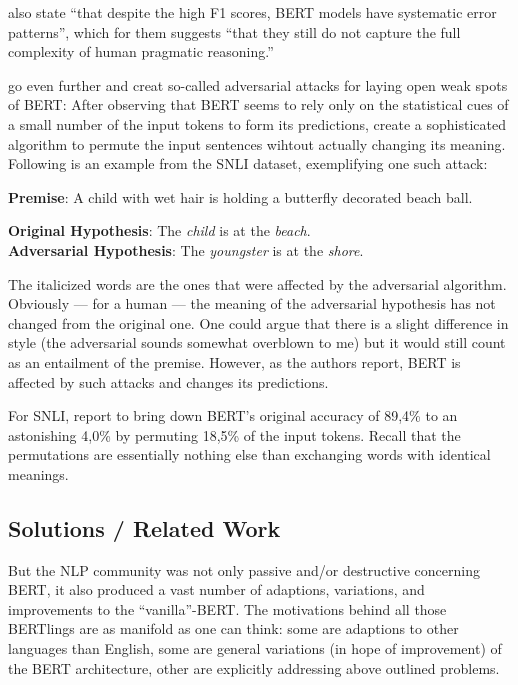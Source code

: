 \cite{jiang2019evaluating} also state ``that despite the high F1 scores, BERT models have
systematic error patterns'', which for them suggests ``that they still do not capture the
full complexity of human pragmatic reasoning.''

\cite{jin2020bert} go even further and creat so-called adversarial attacks for laying open
weak spots of BERT: After observing that BERT seems to rely only on the statistical cues of a
small number of the input tokens to form its predictions, \citeauthor{jin2020bert} create a
sophisticated algorithm to permute the input sentences wihtout actually changing its meaning.
Following is an example from the SNLI \citep{bowman2015snli} dataset, exemplifying one such
attack:

\begin{examples}
  \item \textbf{Premise}: A child with wet hair is holding a butterfly decorated beach ball.

        \textbf{Original Hypothesis}: The \emph{child} is at the \emph{beach}.\\
        \textbf{Adversarial Hypothesis}: The \emph{youngster} is at the \emph{shore}.
\end{examples}

The italicized words are the ones that were affected by the adversarial algorithm.
Obviously --- for a human --- the meaning of the adversarial hypothesis has not
changed from the original one. One could argue that there is a slight difference
in style (the adversarial sounds somewhat overblown to me) but it would still count
as an entailment of the premise. However, as the authors report, BERT is affected
by such attacks and changes its predictions.

For SNLI, \citeauthor{jin2020bert} report to bring down BERT's original accuracy of
89,4\% to an astonishing 4,0\% by permuting 18,5\% of the input tokens. Recall that
the permutations are essentially nothing else than exchanging words with identical meanings.




\subsection{Solutions / Related Work}

But the NLP community was not only passive and/or destructive concerning BERT, it also produced a
vast number of adaptions, variations, and improvements to the ``vanilla''-BERT. The motivations
behind all those BERTlings are as manifold as one can think: some are adaptions to other languages
than English, some are general variations (in hope of improvement) of the BERT architecture, other
are explicitly addressing above outlined problems.

